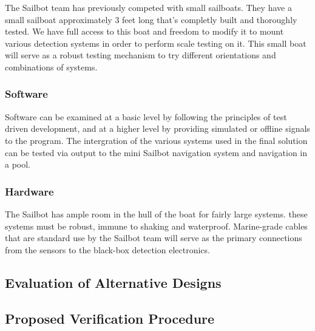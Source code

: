 The Sailbot team has previously competed with small sailboats. They have a small sailboat approximately 3 feet long that's completly built and thoroughly tested. We have full access to this boat and freedom to modify it to mount various detection systems in order to perform scale testing on it. This small boat will serve as a robust testing mechanism to try different orientations and combinations of systems.

\subsubsection{\label{sec:method:proposed-analysis:software}Software}
Software can be examined at a basic level by following the principles of test driven development, and at a higher level by providing simulated or offline signals to the program. The intergration of the various systems used in the final solution can be tested via output to the mini Sailbot navigation system and navigation in a pool.

\subsubsection{\label{sec:method:proposed-analysis:hardware}Hardware}
The Sailbot has ample room in the hull of the boat for fairly large systems. these systems must be robust, immune to shaking and waterproof. Marine-grade cables that are standard use by the Sailbot team will serve as the primary connections from the sensors to the black-box detection electronics.


\subsection{\label{sec:method:evaluation-of-alternative-designs}Evaluation of Alternative Designs}

\subsection{\label{sec:method:proposed-verification-procedure}Proposed Verification Procedure}